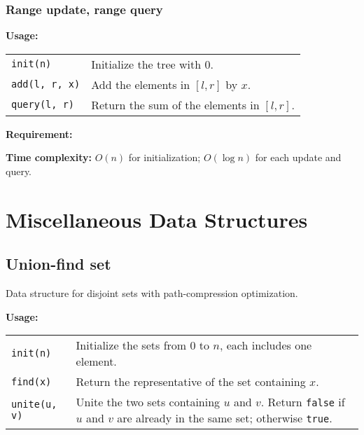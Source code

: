 \subsubsection{Range update, range query}
\textbf{Usage:} \\[0.1cm]
\begin{tabular}{p{3cm} p{8.5cm}}
  \lstinline|init(n)| & Initialize the tree with 0. \\
  \lstinline|add(l, r, x)| & Add the elements in $[l, r]$ by $x$. \\
  \lstinline|query(l, r)| & Return the sum of the elements in $[l, r]$.
\end{tabular} \par
\textbf{Requirement:} \\
 \par
\textbf{Time complexity:} $O(n)$ for initialization; $O(\log n)$ for each update and query. \par


\section{Miscellaneous Data Structures}
\subsection{Union-find set}
Data structure for disjoint sets with path-compression optimization. \par
\textbf{Usage:} \\[0.1cm]
\begin{tabular}{p{2cm} p{9.5cm}}
  \lstinline|init(n)| & Initialize the sets from 0 to $n$, each includes one element. \\
  \lstinline|find(x)| & Return the representative of the set containing $x$. \\
  \lstinline|unite(u, v)| & Unite the two sets containing $u$ and $v$. Return \lstinline|false| if $u$ and $v$ are already in the same set; otherwise \lstinline|true|. \\
\end{tabular} \par


